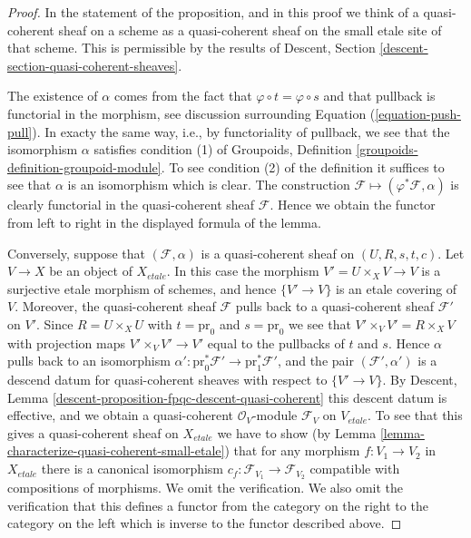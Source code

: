 \begin{proof}
In the statement of the proposition, and in this proof we think of a
quasi-coherent sheaf on a scheme as a quasi-coherent sheaf on the small
etale site of that scheme. This is permissible by the results of
Descent, Section \ref{descent-section-quasi-coherent-sheaves}.

\medskip\noindent
The existence of $\alpha$ comes from the fact that
$\varphi \circ t = \varphi \circ s$ and that pullback is
functorial in the morphism, see discussion surrounding
Equation (\ref{equation-push-pull}). In exacty the same way, i.e., by
functoriality of pullback, we see that the isomorphism $\alpha$ satisfies
condition (1) of
Groupoids, Definition \ref{groupoids-definition-groupoid-module}.
To see condition (2) of the definition it suffices to see that $\alpha$
is an isomorphism which is clear. The construction
$\mathcal{F} \mapsto (\varphi^*\mathcal{F}, \alpha)$
is clearly functorial in the quasi-coherent sheaf $\mathcal{F}$.
Hence we obtain the functor from left to right in the displayed
formula of the lemma.

\medskip\noindent
Conversely, suppose that $(\mathcal{F}, \alpha)$ is a quasi-coherent
sheaf on $(U, R, s, t, c)$. Let $V \to X$ be an object of $X_{etale}$.
In this case the morphism $V' = U \times_X V \to V$ is a surjective etale
morphism of schemes, and hence $\{V' \to V\}$ is an etale
covering of $V$. Moreover, the quasi-coherent sheaf $\mathcal{F}$
pulls back to a quasi-coherent sheaf $\mathcal{F}'$ on $V'$.
Since $R = U \times_X U$ with $t = \text{pr}_0$ and $s = \text{pr}_0$
we see that $V' \times_V V' = R \times_X V$ with projection maps
$V' \times_V V' \to V'$ equal to the pullbacks of $t$ and $s$. Hence
$\alpha$ pulls back to an isomorphism
$\alpha' : \text{pr}_0^*\mathcal{F}' \to \text{pr}_1^*\mathcal{F}'$, and
the pair $(\mathcal{F}', \alpha')$ is a descend datum for quasi-coherent
sheaves with respect to $\{V' \to V\}$. By
Descent, Lemma \ref{descent-proposition-fpqc-descent-quasi-coherent}
this descent datum is effective, and we obtain a quasi-coherent
$\mathcal{O}_V$-module $\mathcal{F}_V$ on $V_{etale}$.
To see that this gives a quasi-coherent sheaf on $X_{etale}$ we have
to show (by
Lemma \ref{lemma-characterize-quasi-coherent-small-etale})
that for any morphism $f : V_1 \to V_2$ in $X_{etale}$
there is a canonical isomorphism
$c_f : \mathcal{F}_{V_1} \to \mathcal{F}_{V_2}$
compatible with compositions of morphisms. We omit the verification.
We also omit the verification that this defines a functor from the
category on the right to the category on the left which is inverse
to the functor described above.
\end{proof}


















